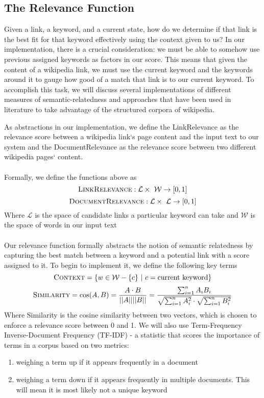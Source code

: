 \documentclass[twoside,11pt]{article}
\begin{document}
\subsection{The Relevance Function}
Given a link, a keyword, and a current state, how do we determine if that link is the best fit for that keyword effectively using the context given to us? In our implementation, there is a crucial consideration: we must be able to somehow use previous assigned keywords as factors in our score. This means that given the content of a wikipedia link, we must use the current keyword and the keywords around it to gauge how good of a match that link is to our current keyword. To accomplish this task, we will discuss several implementations of different measures of semantic-relatedness and approaches that have been used in literature to take advantage of the structured corpora of wikipedia.

As abstractions in our implementation, we define the {\sc LinkRelevance} as the relevance score between a wikipedia link`s page content and the input text to our system and the {\sc DocumentRelevance} as the relevance score between two different wikipedia pages` content.
\\ \\
Formally, we define the functions above as
$$\mbox{\sc LinkRelevance}: \mathcal{L} \times \ \mathcal{W}  \rightarrow [0, 1]$$
$$\mbox{\sc DocumentRelevance}: \mathcal{L} \times \ \mathcal{L}  \rightarrow [0, 1]$$
Where $\mathcal{L}$ is the space of candidate links a particular keyword can take and $\mathcal{W}$ is the space of words in our input text
\\ \\
Our relevance function formally abstracts the notion of semantic relatedness by capturing the best match between a keyword and a potential link with a score assigned to it. To begin to implement it, we define the following key terms
$$\mbox{\sc Context} = \{w \in \mathcal{W} - \{c\} \ | \ c = \mbox{current keyword}\} $$
$$\mbox{\sc Similarity} = \cos(A, B) = \frac{A \cdot B}{||A|| ||B||} = \frac{\sum_{i=1}^{n} A_iB_i}{\sqrt{\sum_{i=1}^{n} A_i^2} \cdot \sqrt{\sum_{i=1}^{n} B_i^2}}$$
Where {\sc Similarity} is the cosine similarity between two vectors, which is chosen to enforce a relevance score between 0 and 1. We will also use Term-Frequency Inverse-Document Frequency (TF-IDF) -  a statistic that scores the importance of terms in a corpus based on two metrics:

\begin{enumerate}
  \item weighing a term up if it appears frequently in a document
  \item weighing a term down if it appears frequently in multiple documents. This will mean it is most likely not a unique keyword
\end{enumerate}
\end{document}
